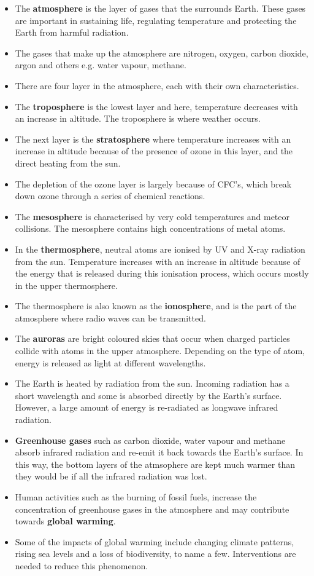 \begin{itemize}
\item{The \textbf{atmosphere} is the layer of gases that the surrounds Earth. These gases are important in sustaining life, regulating temperature and protecting the Earth from harmful radiation.}
\item{The gases that make up the atmosphere are nitrogen, oxygen, carbon dioxide, argon and others e.g. water vapour, methane.}
\item{There are four layer in the atmosphere, each with their own characteristics.}
\item{The \textbf{troposphere} is the lowest layer and here, temperature decreases with an increase in altitude. The troposphere is where weather occurs.}
\item{The next layer is the \textbf{stratosphere} where temperature increases with an increase in altitude because of the presence of ozone in this layer, and the direct heating from the sun.}
\item{The depletion of the ozone layer is largely because of CFC's, which break down ozone through a series of chemical reactions.}
\item{The \textbf{mesosphere} is characterised by very cold temperatures and meteor collisions. The mesosphere contains high concentrations of metal atoms.}
\item{In the \textbf{thermosphere}, neutral atoms are ionised by UV and X-ray radiation from the sun. Temperature increases with an increase in altitude because of the energy that is released during this ionisation process, which occurs mostly in the upper thermosphere. }
\item{The thermosphere is also known as the \textbf{ionosphere}, and is the part of the atmosphere where radio waves can be transmitted.}
\item{The \textbf{auroras} are bright coloured skies that occur when charged particles collide with atoms in the upper atmosphere. Depending on the type of atom, energy is released as light at different wavelengths.}
\item{The Earth is heated by radiation from the sun. Incoming radiation has a short wavelength and some is absorbed directly by the Earth's surface. However, a large amount of energy is re-radiated as longwave infrared radiation.}
\item{\textbf{Greenhouse gases} such as carbon dioxide, water vapour and methane absorb infrared radiation and re-emit it back towards the Earth's surface. In this way, the bottom layers of the atmsophere are kept much warmer than they would be if all the infrared radiation was lost.}
\item{Human activities such as the burning of fossil fuels, increase the concentration of greenhouse gases in the atmosphere and may contribute towards \textbf{global warming}.}
\item{Some of the impacts of global warming include changing climate patterns, rising sea levels and a loss of biodiversity, to name a few. Interventions are needed to reduce this phenomenon.}
\end{itemize}

